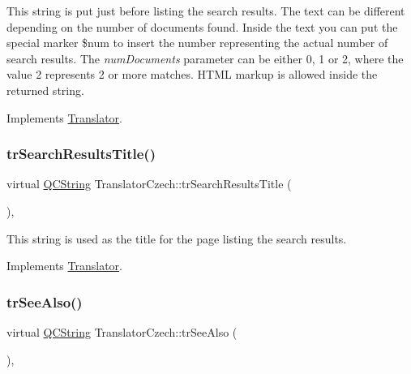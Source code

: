 This string is put just before listing the search results. The text can be different depending on the number of documents found. Inside the text you can put the special marker \$num to insert the number representing the actual number of search results. The {\itshape num\+Documents} parameter can be either 0, 1 or 2, where the value 2 represents 2 or more matches. H\+T\+ML markup is allowed inside the returned string. 

Implements \mbox{\hyperlink{class_translator}{Translator}}.

\mbox{\label{class_translator_czech_a9e8cc117dd63c1cd8563c21e400f6b63}} 
\subsubsection{\texorpdfstring{trSearchResultsTitle()}{trSearchResultsTitle()}}
{\footnotesize\ttfamily virtual \mbox{\hyperlink{class_q_c_string}{Q\+C\+String}} Translator\+Czech\+::tr\+Search\+Results\+Title (\begin{DoxyParamCaption}{ }\end{DoxyParamCaption})\hspace{0.3cm}{\ttfamily [inline]}, {\ttfamily [virtual]}}

This string is used as the title for the page listing the search results. 

Implements \mbox{\hyperlink{class_translator}{Translator}}.

\mbox{\label{class_translator_czech_a7499e6d6b448ac0ebed45dd8ee7333cd}} 
\subsubsection{\texorpdfstring{trSeeAlso()}{trSeeAlso()}}
{\footnotesize\ttfamily virtual \mbox{\hyperlink{class_q_c_string}{Q\+C\+String}} Translator\+Czech\+::tr\+See\+Also (\begin{DoxyParamCaption}{ }\end{DoxyParamCaption})\hspace{0.3cm}{\ttfamily [inline]}, {\ttfamily [virtual]}}


